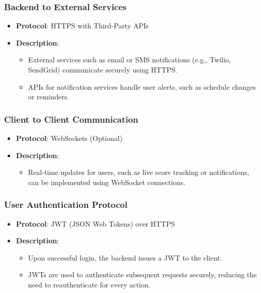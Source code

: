 \documentclass[12pt, titlepage]{article}
\begin{document}
\subsubsection*{Backend to External Services}
\begin{itemize}
    \item \textbf{Protocol}: HTTPS with Third-Party APIs
    \item \textbf{Description}:
    \begin{itemize}
        \item External services such as email or SMS notifications (e.g., Twilio, SendGrid) communicate securely using HTTPS.
        \item APIs for notification services handle user alerts, such as schedule changes or reminders.
    \end{itemize}
\end{itemize}

\subsubsection*{Client to Client Communication}
\begin{itemize}
    \item \textbf{Protocol}: WebSockets (Optional)
    \item \textbf{Description}:
    \begin{itemize}
        \item Real-time updates for users, such as live score tracking or notifications, can be implemented using WebSocket connections.
    \end{itemize}
\end{itemize}

\subsubsection*{User Authentication Protocol}
\begin{itemize}
    \item \textbf{Protocol}: JWT (JSON Web Tokens) over HTTPS
    \item \textbf{Description}:
    \begin{itemize}
        \item Upon successful login, the backend issues a JWT to the client.
        \item JWTs are used to authenticate subsequent requests securely, reducing the need to reauthenticate for every action.
    \end{itemize}
\end{itemize}
\end{document}
